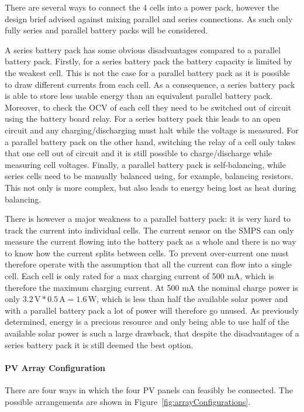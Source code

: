 \documentclass[a4paper]{article}
\newcommand{\unit}[1]{\ensuremath{\, \mathrm{#1}}}
\begin{document}
There are several ways to connect the 4 cells into a power pack, 
however the design brief advised against mixing parallel and series 
connections\cite{energyBrief}. As such only fully series and parallel 
battery packs will be considered. 

A series battery pack has some obvious disadvantages compared to 
a parallel battery pack. Firstly, for a series battery pack the 
battery capacity is limited by the weakest cell. This is not the 
case for a parallel battery pack as it is possible to draw different 
currents from each cell. As a consequence, a series battery pack
is able to store less usable energy than an equivalent parallel 
battery pack. Moreover, to check the OCV of each cell they need 
to be switched out of circuit using the battery board relay. 
For a series battery pack this leads to an open circuit and 
any charging/discharging must halt while the voltage is measured. 
For a parallel battery pack on the other hand, switching the 
relay of a cell only takes that one cell out of circuit and it 
is still possible to charge/discharge while measuring cell 
voltages. Finally, a parallel battery pack is 
self-balancing\cite{batteryBalancing}, while series cells 
need to be manually balanced using, for example, balancing 
resistors. This not only is more complex, but also leads to 
energy being lost as heat during balancing.

There is however a major weakness to a parallel battery pack: it is 
very hard to track the current into individual cells. The current 
sensor on the SMPS can only measure the current flowing into the 
battery pack as a whole and there is no way to know how the 
current splits between cells. To prevent over-current one must 
therefore operate with the assumption that all the current can 
flow into a single cell. Each cell is only rated for a max charging 
current of 500 mA\cite{batteryDatasheet}, which is therefore the 
maximum charging current. At 500 mA the nominal charge power is 
only \(3.2 \unit{V} * 0.5 \unit{A} = 1.6 \unit{W} \), which is 
less than half the available solar power and with a parallel 
battery pack a lot of power will therefore go unused. As 
previously determined, energy is a precious resource and only 
being able to use half of the available solar power is such a 
large drawback, that despite the disadvantages of a series battery 
pack it is still deemed the best option.

\paragraph*{PV Array Configuration}
There are four ways in which the four PV panels can feasibly be connected. 
The possible arrangements are shown in Figure~\ref{fig:arrayConfigurations}.
\end{document}
